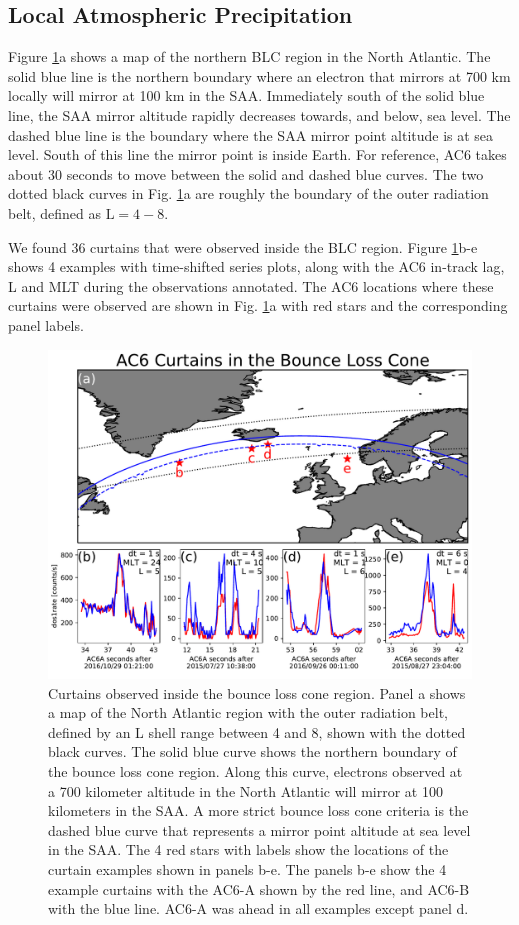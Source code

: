 \documentclass[draft]{agujournal2019}
\begin{document}
\subsection{Local Atmospheric Precipitation}
Figure \ref{fig3}a shows a map of the northern BLC region in the North Atlantic. The solid blue line is the northern boundary where an electron that mirrors at 700 km locally will mirror at 100 km in the SAA. Immediately south of the solid blue line, the SAA mirror altitude rapidly decreases towards, and below, sea level. The dashed blue line is the boundary where the SAA mirror point altitude is at sea level. South of this line the mirror point is inside Earth. For reference, AC6 takes about 30 seconds to move between the solid and dashed blue curves. The two dotted black curves in Fig. \ref{fig3}a are roughly the boundary of the outer radiation belt, defined as $\mathrm{L}=4-8$.

We found 36 curtains that were observed inside the BLC region. Figure \ref{fig3}b-e shows 4 examples with time-shifted series plots, along with the AC6 in-track lag, L and MLT during the observations annotated. The AC6 locations where these curtains were observed are shown in Fig. \ref{fig3}a with red stars and the corresponding panel labels.

\begin{figure}
\includegraphics[width=\textwidth]{fig3.pdf}
\caption{Curtains observed inside the bounce loss cone region. Panel a shows a map of the North Atlantic region with the outer radiation belt, defined by an L shell range between 4 and 8, shown with the dotted black curves. The solid blue curve shows the northern boundary of the bounce loss cone region. Along this curve, electrons observed at a 700 kilometer altitude in the North Atlantic will mirror at 100 kilometers in the SAA. A more strict bounce loss cone criteria is the dashed blue curve that represents a mirror point altitude at sea level in the SAA. The 4 red stars with labels show the locations of the curtain examples shown in panels b-e. The panels b-e show the 4 example curtains with the AC6-A shown by the red line, and AC6-B with the blue line. AC6-A was ahead in all examples except panel d.}
\label{fig3}
\end{figure}
\end{document}
